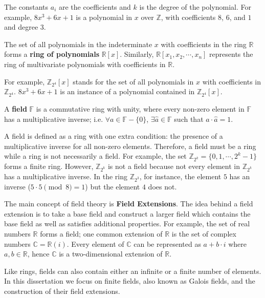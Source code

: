 The constants $a_i$ are the coefficients and $k$ is the degree of the polynomial. 
For example, $8x^3 + 6x + 1$ is a polynomial in $x$ over $\mathbb{Z}$, with
coefficients $8$, $6$, and $1$ and degree $3$. 

\begin{Definition}
The set of all polynomials in the indeterminate
$x$ with coefficients in the ring $\mathbb{R}$ forms a {\bf
ring of polynomials} $\mathbb{R}[x]$. 
Similarly, $\mathbb{R}[x_1,x_{2},\cdots, x_{n}]$ 
represents the ring of multivariate polynomials with coefficients in $\mathbb{R}$.
\end{Definition}

For example, $\mathbb{Z}_{2^4}[x]$ stands for the set of all polynomials in
$x$ with coefficients in $\mathbb{Z}_{2^4}$. $8x^3 + 6x + 1$ is an instance 
of a polynomial contained in $\mathbb{Z}_{2^4}[x]$.

\begin{Definition}
A {\bf field} $\mathbb{F}$ is a commutative ring with unity, where every
non-zero element in $\mathbb{F}$ has a multiplicative inverse; i.e. $\forall
a \in \mathbb{F} - \{0\}$, $\exists \hat{a} \in \mathbb{F}$ such that $ a \cdot
\hat{a} = 1$.
\end{Definition}

A field is defined as a ring with one extra condition: the presence of a 
multiplicative inverse for all non-zero elements.
Therefore, a field must be a ring while a ring is not necessarily a field.
For example, the set $\mathbb{Z}_{2^k} = \{0,1,\cdots, 2^k-1\}$ forms a finite ring.
However, $\mathbb{Z}_{2^k}$ is not a field because not every element in
$\mathbb{Z}_{2^k}$ has a multiplicative inverse. 
In the ring $\mathbb{Z}_{2^3}$, for 
instance, the element $5$ has an inverse ($5\cdot5\pmod{8}=1$) but the element $4$
does not.

The main concept of field theory is {\bf Field Extensions}. The idea behind a
field extension is to take a base field and construct a larger field which 
contains the base field as well as satisfies additional properties. For example,
the set of real numbers $\mathbb{R}$ forms a field; one common extension of 
$\mathbb{R}$ is the set of complex numbers $\mathbb{C}=\mathbb{R}(i)$. Every
element of $\mathbb{C}$ can be represented as $a+b\cdot i$ where $a,b \in \mathbb{R}$,
hence $\mathbb{C}$ is a two-dimensional extension of $\mathbb{R}$.

Like rings, fields can also contain either an infinite or a finite number of 
elements. 
In this dissertation we focus on finite fields, also known as Galois fields, and 
the construction of their field extensions.

